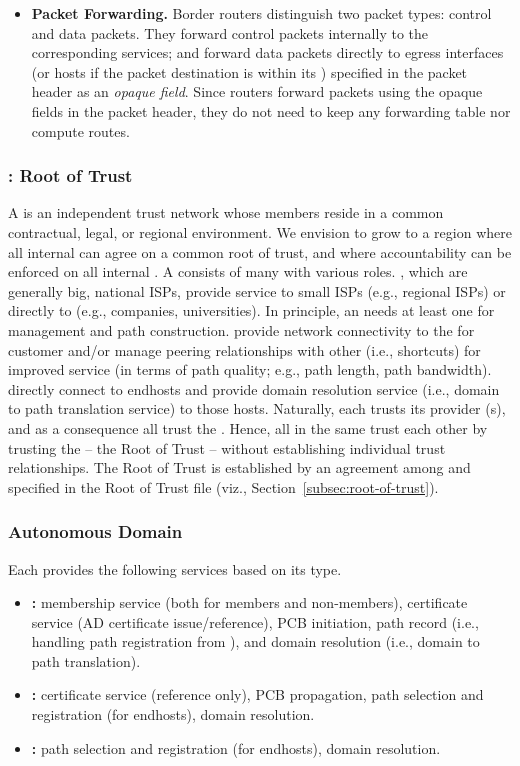 \begin{itemize}
\item {\bf Packet Forwarding. } Border routers distinguish two packet types:
  control and data packets. They forward control packets internally to the
  corresponding services; and forward data packets directly to egress interfaces
  (or hosts if the packet destination is within its \AD) specified in the packet
  header as an \textit{opaque field}. Since routers forward packets using the
  opaque fields in the packet header, they do not need to keep any forwarding
  table nor compute routes.
\end{itemize}

\subsubsection{\ISD: Root of Trust}

A \ISD is an independent {trust} network whose members reside in a common
contractual, legal, or regional environment. We envision \ISDs to grow to a
region where all internal \ADs can agree on a common root of trust, and where
accountability can be enforced on all internal \ADs. A \ISD consists of many \ADs
with various roles. \ISDC \ADs, which are generally big, national ISPs, provide
service to small ISPs (e.g., regional ISPs) or directly to \STUB \ADs (e.g.,
companies, universities). In principle, an \ISD needs at least one \ISDC \AD for
\ISD management and path construction. \TRAN \ADs provide network connectivity to
the \ISDC for customer \ADs and/or manage peering relationships with other \TRAN \ADs
(i.e., shortcuts) for improved service (in terms of path quality; e.g., path
length, path bandwidth). \STUB \ADs directly connect to endhosts and provide
domain resolution service (i.e., domain to path translation service) to those
hosts. Naturally, each \AD trusts its provider \AD(s), and as a consequence all
\ADs trust the \ISDC. Hence, all \STUB \ADs in the same \ISD trust each other by
trusting the \ISDC -- the Root of Trust -- without establishing individual trust
relationships. The Root of Trust is established by an agreement among \ISDC \ADs
and specified in the Root of Trust file (viz., Section~\ref{subsec:root-of-trust}).

\subsubsection{Autonomous Domain}
Each \AD provides the following services based on its type.
\begin{itemize}
\item {\bf \ISDC \AD: } \ISD membership service (both for \ISDC members and non-\ISDC members), certificate service (AD certificate issue/reference), PCB initiation, path record (i.e., handling path registration from \STUB \ADs), and domain resolution (i.e., domain to path translation).
\item {\bf \TRAN \AD: } certificate service (reference only), PCB propagation, path selection and registration (for endhosts), domain resolution.
\item {\bf \STUB \AD: } path selection and registration (for endhosts), domain resolution. 
\end{itemize}

